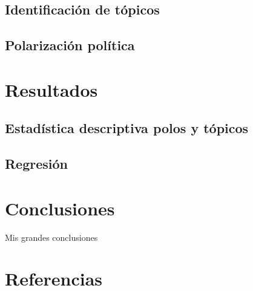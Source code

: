 \documentclass[
  12pt,
]{article}
\begin{document}
\hypertarget{identificaciuxf3n-de-tuxf3picos}{%
\subsection{Identificación de
tópicos}\label{identificaciuxf3n-de-tuxf3picos}}

\hypertarget{polarizaciuxf3n-poluxedtica}{%
\subsection{Polarización política}\label{polarizaciuxf3n-poluxedtica}}

\hypertarget{resultados}{%
\section{Resultados}\label{resultados}}

\hypertarget{estaduxedstica-descriptiva-polos-y-tuxf3picos}{%
\subsection{Estadística descriptiva polos y
tópicos}\label{estaduxedstica-descriptiva-polos-y-tuxf3picos}}

\hypertarget{regresiuxf3n}{%
\subsection{Regresión}\label{regresiuxf3n}}

\hypertarget{conclusiones}{%
\section{Conclusiones}\label{conclusiones}}

Mis grandes conclusiones

\newpage

\hypertarget{referencias}{%
\section*{Referencias}\label{referencias}}
\end{document}
